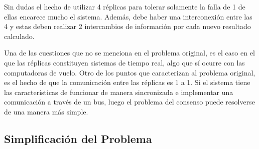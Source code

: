 Sin dudas el hecho de utilizar 4 réplicas para tolerar solamente la falla de 1 de ellas encarece mucho el sistema. Además, debe haber una interconexión entre las 4 y estas deben realizar 2 intercambios de información por cada nuevo resultado calculado.

Una de las cuestiones que no se menciona en el problema original, es el caso en el que las réplicas constituyen sistemas de tiempo real, algo que sí ocurre con las computadoras de vuelo. Otro de los puntos que caracterizan al problema original, es el hecho de que la comunicación entre las réplicas es 1 a 1. Si el sistema tiene las características de funcionar de manera sincronizada e implementar una comunicación a través de un bus, luego el problema del consenso puede resolverse de una manera más simple.





\subsection{Simplificación del Problema}



